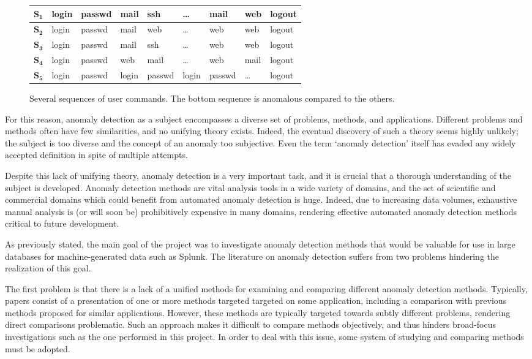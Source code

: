 \begin{figure}[htb]
    \centering
    \begin{tabular}{| l | l l l l l l l l |}
        \hline
        $\mathbf{S_1}$ & login & passwd & mail & ssh & \dots & mail & web & logout \\ \hline
        $\mathbf{S_2}$ & login & passwd & mail & web & \dots & web & web & logout \\ \hline
        $\mathbf{S_3}$ & login & passwd & mail & ssh & \dots & web & web & logout \\ \hline
        $\mathbf{S_4}$ & login & passwd & web & mail & \dots & web & mail & logout \\ \hline
        $\mathbf{S_5}$ & login & passwd & login & passwd & login & passwd & \dots & logout \\\hline
    \end{tabular}
    \caption{Several sequences of user commands. The bottom sequence is anomalous compared to the others.}
    \label{fig:example1}
\end{figure}

For this reason, anomaly detection as a subject encompasses a diverse set of problems, methods, and applications. Different problems and methods often have few similarities, and no unifying theory exists. Indeed, the eventual discovery of such a theory seems highly unlikely; the subject is too diverse and the concept of an anomaly too subjective. Even the term `anomaly detection' itself has evaded any widely accepted definition \cite{hodge} in spite of multiple attempts. 

Despite this lack of unifying theory, anomaly detection is a very important task, and it is crucial that a thorough understanding of the subject is developed. Anomaly detection methods are vital analysis tools in a wide variety of domains, and the set of scientific and commercial domains which could benefit from automated anomaly detection is huge. Indeed, due to increasing data volumes, exhaustive manual analysis is (or will soon be) prohibitively expensive in many domains, rendering effective automated anomaly detection methods critical to future development.

As previously stated, the main goal of the project was to investigate anomaly detection methods that would be valuable for use in large databases for machine-generated data such as Splunk. The literature on anomaly detection suffers from two problems hindering the realization of this goal.

The first problem is that there is a lack of a unified methods for examining and comparing different anomaly detection methods. Typically, papers consist of a presentation of one or more methods targeted targeted on some application, including a comparison  with previous methods proposed for similar applications. However, these methods are typically targeted towards subtly different problems, rendering direct comparisons problematic. Such an approach makes it difficult to compare methods objectively, and thus hinders broad-focus investigations such as the one performed in this project. In order to deal with this issue, some system of studying and comparing methods must be adopted.

